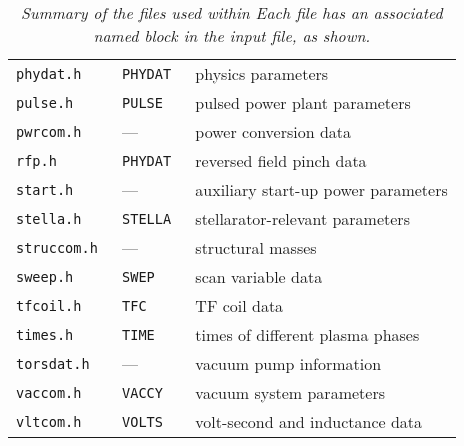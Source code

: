 \begin{table}
\begin{center}
\begin{tabular}{||l|l||l||}
\tt phydat.h    & \tt PHYDAT           & physics parameters \\
\tt pulse.h     & \tt PULSE            & pulsed power plant parameters \\
\tt pwrcom.h    &     ---              & power conversion data \\
\tt rfp.h       & \tt PHYDAT           & reversed field pinch data \\
\tt start.h     &     ---              & auxiliary start-up power parameters \\
\tt stella.h    & \tt STELLA           & stellarator-relevant parameters \\
\tt struccom.h  &     ---              & structural masses \\
\tt sweep.h     & \tt SWEP             & scan variable data \\
\tt tfcoil.h    & \tt TFC              & TF coil data \\
\tt times.h     & \tt TIME             & times of different plasma phases \\
\tt torsdat.h   &     ---              & vacuum pump information \\
\tt vaccom.h    & \tt VACCY            & vacuum system parameters \\
\tt vltcom.h    & \tt VOLTS            & volt-second and inductance data \\
\hline
\end{tabular}
\end{center}
\caption[TABLE_INC]{{\it
Summary of the \INCLUDE files used within \PSD Each file has an
associated named block in the input file, as shown.
}}
\label{tab:includes}
\end{table}
